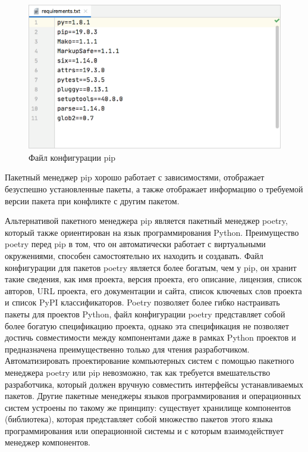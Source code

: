 \begin{figure}[H]
	\includegraphics[scale=0.3]{author/part5/figures/pip.png}
	\caption{Файл конфигурации pip}
	\label{fig:pip}
\end{figure}

Пакетный менеджер pip хорошо работает с зависимостями, отображает безуспешно установленные пакеты, а также отображает информацию о требуемой версии пакета при конфликте с другим пакетом.

Альтернативой пакетного менеджера pip является пакетный менеджер poetry, который также ориентирован на язык программирования Python. Преимущество poetry перед pip в том, что он автоматически работает с виртуальными окружениями, способен самостоятельно их находить и создавать. Файл конфигурации для пакетов poetry является более богатым, чем у pip, он хранит такие сведения, как имя проекта, версия проекта, его описание, лицензия, список авторов, URL проекта, его документации и сайта, список ключевых слов проекта и список PyPI классификаторов. Poetry позволяет более гибко настраивать пакеты для проектов Python, файл конфигурации poetry представляет собой более богатую спецификацию проекта, однако эта спецификация не позволяет достичь совместимости между компонентами даже в рамках Python проектов и предназначена преимущественно только для чтения разработчиком. Автоматизировать проектирование компьютерных систем с помощью пакетного менеджера poetry или pip невозможно, так как требуется вмешательство разработчика, который должен вручную совместить интерфейсы устанавливаемых пакетов. Другие пакетные менеджеры языков программирования и операционных систем устроены по такому же принципу: существует хранилище компонентов (библиотека), которая представляет собой множество пакетов этого языка программирования или операционной системы и с которым взаимодействует менеджер компонентов.

